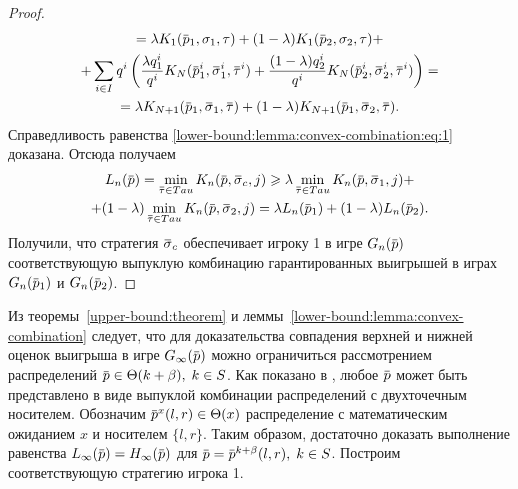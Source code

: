 {\begin{proof}
\begin{gather*}
    = \lambda \K[1](\p_1, \sigma_1, \tau) +
    (1-\lambda) \K[1](\p_2, \sigma_2, \tau) + \\
    + \sum_{i \in I} q^i \left(
      \frac{\lambda q^i_1}{q^i} \K[N](\p^i_1, \sigmav^i_1, \tauv^i) +
      \frac{(1-\lambda) q^i_2}{q^i} \K[N](\p^i_2, \sigmav^i_2, \tauv^i)
    \right) = \\
    = \lambda \K[N+1](\p_1, \sigmav_1, \tauv) +
    (1-\lambda)\K[N+1](\p_1, \sigmav_2, \tauv).
  \end{gather*}
  Справедливость равенства \eqref{lower-bound:lemma:convex-combination:eq:1}
  доказана. Отсюда получаем
  \begin{multline*}
    \Low[n](\p) = \min_{\tauv \in Tau} \K[n](\p, \sigmav_c, j) \geqslant
    \lambda \min_{\tauv \in Tau} \K[n](\p, \sigmav_1, j) + \\
    + (1-\lambda) \min_{\tauv \in Tau} \K[n](\p, \sigmav_2, j) =
    \lambda \Low[n](\p_1) + (1-\lambda) \Low[n](\p_2).
  \end{multline*}
  Получили, что стратегия $\sigmav_c$ обеспечивает игроку 1 в игре $\theGame[n](\p)$
  соответствующую выпуклую комбинацию гарантированных выигрышей в играх
  $\theGame[n](\p_1)$ и $\theGame[n](\p_2)$.
\end{proof}

Из теоремы~\ref{upper-bound:theorem} и
леммы~\ref{lower-bound:lemma:convex-combination} следует, что для доказательства
совпадения верхней и нижней оценок выигрыша в игре $\theGame[\infty](\p)$ можно
ограничиться рассмотрением распределений $\p \in \Theta(k + \beta), \; k \in S$.
Как показано в \cite{domansky11}, любое $\p$ может быть представлено в виде
выпуклой комбинации распределений с двухточечным носителем. Обозначим $\p^x(l,
r) \in \Theta(x)$ распределение с математическим ожиданием $x$ и носителем $\{l,
r\}$. Таким образом, достаточно доказать выполнение равенства $\Low(\p) =
\High(\p)$ для $\p = \p^{k+\beta}(l,r), \; k \in S$. Построим соответствующую
стратегию игрока 1.

}
